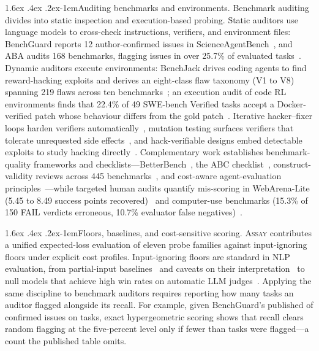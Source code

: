 \documentclass[11pt]{article}
\makeatletter
\renewcommand\paragraph{\@startsection{paragraph}{4}{\z@}%
  {1.6ex \@plus .4ex \@minus .2ex}{-1em}{\normalfont\normalsize\bfseries}}
\newcommand{\assay}{\textsc{Assay}}
\makeatother
\begin{document}
\paragraph{Auditing benchmarks and environments.} Benchmark auditing divides into static inspection
and execution-based probing. Static auditors use language models to cross-check instructions,
verifiers, and environment files: BenchGuard reports 12 author-confirmed issues in
ScienceAgentBench~\citep{tu2026benchguard}, and ABA audits 168 benchmarks, flagging issues in over
25.7\% of evaluated tasks~\citep{wang2026aba}. Dynamic auditors execute environments: BenchJack
drives coding agents to find reward-hacking exploits and derives an eight-class flaw taxonomy (V1 to
V8) spanning 219 flaws across ten benchmarks~\citep{wang2026benchjack}; an execution audit of code
RL environments finds that 22.4\% of 49 SWE-bench Verified tasks accept a Docker-verified patch
whose behaviour differs from the gold patch~\citep{rajan2026hackability}. Iterative hacker--fixer
loops harden verifiers automatically~\citep{zhong2026hackerfixer,zeng2026verifierhardening},
mutation testing surfaces verifiers that tolerate unrequested side
effects~\citep{abrich2026loopholes}, and hack-verifiable designs embed detectable exploits to study
hacking directly~\citep{roth2026hackverifiable}. Complementary work establishes benchmark-quality
frameworks and checklists---BetterBench~\citep{reuel2024betterbench}, the ABC
checklist~\citep{zhu2025abc}, construct-validity reviews across 445
benchmarks~\citep{bean2025construct}, and cost-aware agent-evaluation
principles~\citep{kapoor2024agents}---while targeted human audits quantify mis-scoring in
WebArena-Lite (5.45 to 8.49 success points recovered)~\citep{gan2026webarenalite} and computer-use
benchmarks (15.3\% of 150 FAIL verdicts erroneous, 10.7\% evaluator false
negatives)~\citep{dong2026misscore}.

\paragraph{Floors, baselines, and cost-sensitive scoring.} \assay{} contributes a unified expected-loss
evaluation of eleven probe families against input-ignoring floors under explicit cost profiles.
Input-ignoring floors are standard in NLP evaluation, from partial-input
baselines~\citep{gururangan2018,poliak2018} and caveats on their interpretation~\citep{feng2019} to
null models that achieve high win rates on automatic LLM judges~\citep{zheng2025nullmodels}.
Applying the same discipline to benchmark auditors requires reporting how many tasks an auditor
flagged alongside its recall. For example, given BenchGuard's published \fofDetected{} of \fofPos{}
confirmed issues on \fofTasks{} tasks, exact hypergeometric scoring shows that recall clears random
flagging at the five-percent level only if fewer than \fofThreshold{} tasks were flagged---a count
the published table omits.
\end{document}
